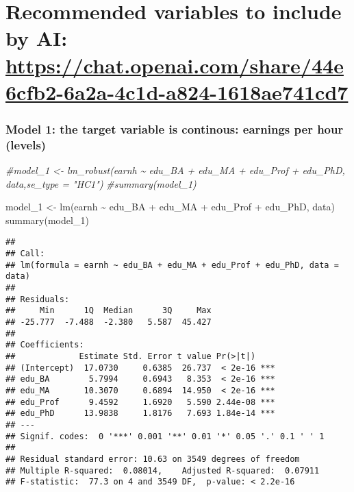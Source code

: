 \documentclass[
]{article}
\newenvironment{Shaded}{\begin{snugshade}}{\end{snugshade}}
\newcommand{\CommentTok}[1]{\textcolor[rgb]{0.56,0.35,0.01}{\textit{#1}}}
\newcommand{\FunctionTok}[1]{\textcolor[rgb]{0.00,0.00,0.00}{#1}}
\newcommand{\NormalTok}[1]{#1}
\newcommand{\OtherTok}[1]{\textcolor[rgb]{0.56,0.35,0.01}{#1}}
\newcommand{\SpecialCharTok}[1]{\textcolor[rgb]{0.00,0.00,0.00}{#1}}
\begin{document}
\hypertarget{recommended-variables-to-include-by-ai-httpschat.openai.comshare44e6cfb2-6a2a-4c1d-a824-1618ae741cd7}{%
\section{\texorpdfstring{Recommended variables to include by AI:
\url{https://chat.openai.com/share/44e6cfb2-6a2a-4c1d-a824-1618ae741cd7}}{Recommended variables to include by AI: https://chat.openai.com/share/44e6cfb2-6a2a-4c1d-a824-1618ae741cd7}}\label{recommended-variables-to-include-by-ai-httpschat.openai.comshare44e6cfb2-6a2a-4c1d-a824-1618ae741cd7}}

\hypertarget{model-1-the-target-variable-is-continous-earnings-per-hour-levels}{%
\subsubsection{Model 1: the target variable is continous: earnings per
hour
(levels)}\label{model-1-the-target-variable-is-continous-earnings-per-hour-levels}}

\begin{Shaded}
\begin{Highlighting}[]
\CommentTok{\#model\_1 \textless{}{-} lm\_robust(earnh \textasciitilde{}  edu\_BA + edu\_MA + edu\_Prof + edu\_PhD, data,se\_type = "HC1")}
\CommentTok{\#summary(model\_1)}

\NormalTok{model\_1 }\OtherTok{\textless{}{-}} \FunctionTok{lm}\NormalTok{(earnh }\SpecialCharTok{\textasciitilde{}}\NormalTok{  edu\_BA }\SpecialCharTok{+}\NormalTok{ edu\_MA }\SpecialCharTok{+}\NormalTok{ edu\_Prof }\SpecialCharTok{+}\NormalTok{ edu\_PhD, data)}
\FunctionTok{summary}\NormalTok{(model\_1)}
\end{Highlighting}
\end{Shaded}

\begin{verbatim}
## 
## Call:
## lm(formula = earnh ~ edu_BA + edu_MA + edu_Prof + edu_PhD, data = data)
## 
## Residuals:
##     Min      1Q  Median      3Q     Max 
## -25.777  -7.488  -2.380   5.587  45.427 
## 
## Coefficients:
##             Estimate Std. Error t value Pr(>|t|)    
## (Intercept)  17.0730     0.6385  26.737  < 2e-16 ***
## edu_BA        5.7994     0.6943   8.353  < 2e-16 ***
## edu_MA       10.3070     0.6894  14.950  < 2e-16 ***
## edu_Prof      9.4592     1.6920   5.590 2.44e-08 ***
## edu_PhD      13.9838     1.8176   7.693 1.84e-14 ***
## ---
## Signif. codes:  0 '***' 0.001 '**' 0.01 '*' 0.05 '.' 0.1 ' ' 1
## 
## Residual standard error: 10.63 on 3549 degrees of freedom
## Multiple R-squared:  0.08014,    Adjusted R-squared:  0.07911 
## F-statistic:  77.3 on 4 and 3549 DF,  p-value: < 2.2e-16
\end{verbatim}
\end{document}
